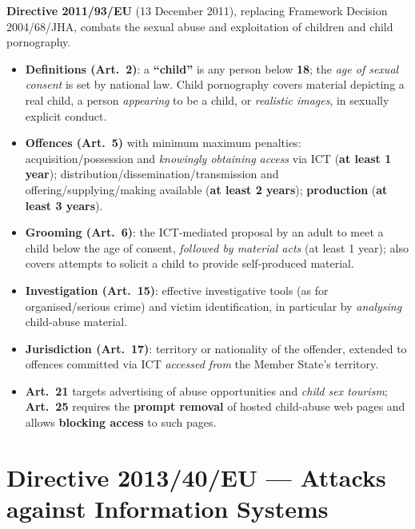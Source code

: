 \documentclass[11pt,a4paper,openany]{report}
\theoremstyle{definition}
\theoremstyle{plain}
\theoremstyle{remark}
\begin{document}
\textbf{Directive 2011/93/EU} (13 December 2011), replacing Framework Decision 2004/68/JHA, combats the sexual abuse and exploitation of children and child pornography.
\begin{itemize}
    \item \textbf{Definitions (Art.\ 2)}: a \textbf{``child''} is any person below \textbf{18}; the \emph{age of sexual consent} is set by national law. Child pornography covers material depicting a real child, a person \emph{appearing} to be a child, or \emph{realistic images}, in sexually explicit conduct.
    \item \textbf{Offences (Art.\ 5)} with minimum maximum penalties: acquisition/possession and \emph{knowingly obtaining access} via ICT (\textbf{at least 1 year}); distribution/dissemination/transmission and offering/supplying/making available (\textbf{at least 2 years}); \textbf{production} (\textbf{at least 3 years}).
    \item \textbf{Grooming (Art.\ 6)}: the ICT-mediated proposal by an adult to meet a child below the age of consent, \emph{followed by material acts} (at least 1 year); also covers attempts to solicit a child to provide self-produced material.
    \item \textbf{Investigation (Art.\ 15)}: effective investigative tools (as for organised/serious crime) and victim identification, in particular by \emph{analysing} child-abuse material.
    \item \textbf{Jurisdiction (Art.\ 17)}: territory or nationality of the offender, extended to offences committed via ICT \emph{accessed from} the Member State's territory.
    \item \textbf{Art.\ 21} targets advertising of abuse opportunities and \emph{child sex tourism}; \textbf{Art.\ 25} requires the \textbf{prompt removal} of hosted child-abuse web pages and allows \textbf{blocking access} to such pages.
\end{itemize}

\section{Directive 2013/40/EU --- Attacks against Information Systems}
\end{document}
